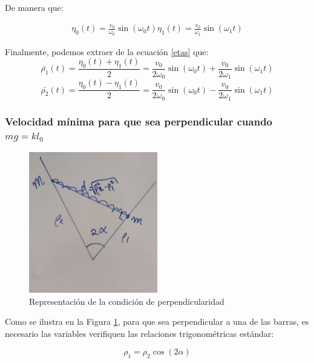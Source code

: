\documentclass[a4paper,12pt]{article}
\begin{document}
De manera que:

\begin{equation}
  \begin{aligned}
  \eta_0 (t) = \frac{v_0}{\omega_0} \sin(\omega_0 t)
  \eta_1 (t) = \frac{v_0}{\omega_1} \sin(\omega_1 t)
  \end{aligned}
\end{equation}

Finalmente, podemos extraer de la ecuación \eqref{etas} que:
\begin{equation}
  \label{rho1}
  \bar{\rho_1}(t) = \frac{\eta_0 (t) + \eta_1(t)}{2} =\frac{v_0}{2\omega_0} \sin(\omega_0 t) +\frac{v_0}{2\omega_1} \sin(\omega_1 t)
\end{equation}
\begin{equation}
  \label{rho2}
  \bar{\rho_2} (t)= \frac{\eta_0 (t) - \eta_1(t)}{2} =\frac{v_0}{2\omega_0} \sin(\omega_0 t) -\frac{v_0}{2\omega_1} \sin(\omega_1 t)
\end{equation}

\subsubsection*{Velocidad mínima para que sea perpendicular cuando $mg = kl_0$}


\begin{figure}[h]
  \centering
  \caption{Representación de la condición de perpendicularidad}
  \label{perp}
  \includegraphics[width=0.5\textwidth]{perp.jpg}
\end{figure}
Como se ilustra en la Figura \ref{perp}, para que sea perpendicular a una de las barras, es necesario las variables verifiquen las relaciones trigonométricas estándar:

\begin{equation}
  \label{rho1rho2}
  \rho_1 = \rho_2 \cos(2\alpha)
\end{equation}
\end{document}
